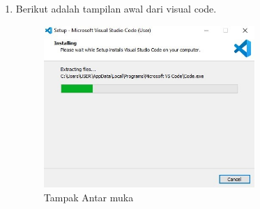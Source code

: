 \begin{enumerate}
\item Berikut adalah tampilan awal dari visual code.
	\begin{figure}[H]
		\includegraphics[width=8cm]{figures/instalasi/vsc6.jpg}
		\centering
		\caption{Tampak Antar muka}
	\end{figure}
\end{enumerate}
